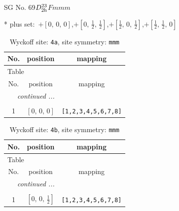 \documentclass[fleqn,8pt]{jsarticle}
\begin{document}
\setcounter{MaxMatrixCols}{32}

\renewcommand{\tablename}{Table~}
\renewcommand{\figurename}{Figure~}
\begin{center}
\LARGE
SG No. 69\quad$D_{\rm 2h}^{23}$\quad$Fmmm$\quad[ orthorhombic ]
\end{center}
* plus set:\,\,\,$+\left[ 0,\, 0,\, 0 \right]$,\quad $+\left[ 0,\, \frac{1}{2},\, \frac{1}{2} \right]$,\quad $+\left[ \frac{1}{2},\, 0,\, \frac{1}{2} \right]$,\quad $+\left[ \frac{1}{2},\, \frac{1}{2},\, 0 \right]$
\renewcommand{\arraystretch}{1.2}
\begin{longtable}{ccc}
\caption{Wyckoff site: {\tt 4a}, site symmetry: {\tt mmm}}
 \\
 \hline \hline
No. & position & mapping \\ \hline \endfirsthead

\multicolumn{2}{l}{\tablename\ \thetable{}} \\
 \hline \hline
No. & position & mapping \\ \hline \endhead

 \hline \hline
\multicolumn{2}{r}{\footnotesize\it continued ...} \\ \endfoot

 \hline \hline
\multicolumn{2}{r}{} \\ \endlastfoot

1 & $\left[ 0,\, 0,\, 0 \right]$ & {\tt [1,2,3,4,5,6,7,8]} \\
\end{longtable}
\renewcommand{\arraystretch}{1.2}
\begin{longtable}{ccc}
\caption{Wyckoff site: {\tt 4b}, site symmetry: {\tt mmm}}
 \\
 \hline \hline
No. & position & mapping \\ \hline \endfirsthead

\multicolumn{2}{l}{\tablename\ \thetable{}} \\
 \hline \hline
No. & position & mapping \\ \hline \endhead

 \hline \hline
\multicolumn{2}{r}{\footnotesize\it continued ...} \\ \endfoot

 \hline \hline
\multicolumn{2}{r}{} \\ \endlastfoot

1 & $\left[ 0,\, 0,\, \frac{1}{2} \right]$ & {\tt [1,2,3,4,5,6,7,8]} \\
\end{longtable}
\renewcommand{\arraystretch}{1.2}
\end{document}
